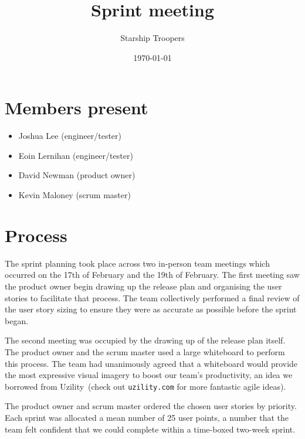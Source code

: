 \documentclass[a4paper,11pt]{article}
\title{Sprint meeting}
\author{Starship Troopers}
\date{\today}
\begin{document}
\maketitle

\section*{Members present}
\begin{itemize}
\item Joshua Lee (engineer/tester)
\item Eoin Lernihan (engineer/tester)
\item David Newman (product owner)
\item Kevin Maloney (scrum master)
\end{itemize}

\section*{Process}
The sprint planning took place across two in-person team meetings
which occurred on the 17th of February and the 19th of February.
The first meeting saw the product owner begin drawing up the release
plan and organising the user stories to facilitate that process. The
team collectively performed a final review of the user story sizing to
ensure they were as accurate as possible before the sprint began.

The second meeting was occupied by the drawing up of the release plan
itself. The product owner and the scrum master used a large whiteboard to
perform this process. The team had unanimously agreed that a whiteboard
would provide the most expressive visual imagery to boost our team's
productivity, an idea we borrowed from Uzility\textregistered\ (check
out \texttt{uzility.com} for more fantastic agile ideas).

The product owner and scrum master ordered the chosen user stories by
priority. Each sprint was allocated a mean number of 25 user points, a
number that the team felt confident that we could complete within a
time-boxed two-week sprint.
\end{document}
